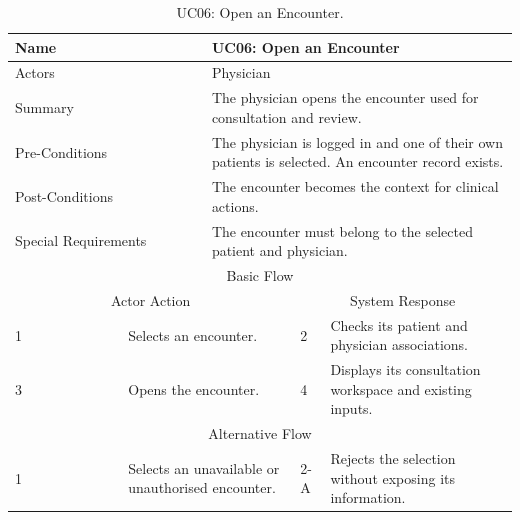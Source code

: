 \begin{table}[htbp]
\centering
\small
\caption{UC06: Open an Encounter.}
\label{tab:kashaf:uc06}
\begin{tabular}{|p{}|p{}|p{}|p{}|p{}|}
\hline
\multicolumn{2}{|p{\dimexpr0.225\textwidth+2\tabcolsep+\arrayrulewidth\relax}|}{Name} & \multicolumn{3}{p{\dimexpr0.575\textwidth+4\tabcolsep+2\arrayrulewidth\relax}|}{UC06: Open an Encounter} \\ \hline
\multicolumn{2}{|p{\dimexpr0.225\textwidth+2\tabcolsep+\arrayrulewidth\relax}|}{Actors} & \multicolumn{3}{p{\dimexpr0.575\textwidth+4\tabcolsep+2\arrayrulewidth\relax}|}{Physician} \\ \hline
\multicolumn{2}{|p{\dimexpr0.225\textwidth+2\tabcolsep+\arrayrulewidth\relax}|}{Summary} & \multicolumn{3}{p{\dimexpr0.575\textwidth+4\tabcolsep+2\arrayrulewidth\relax}|}{The physician opens the encounter used for consultation and review.} \\ \hline
\multicolumn{2}{|p{\dimexpr0.225\textwidth+2\tabcolsep+\arrayrulewidth\relax}|}{Pre-Conditions} & \multicolumn{3}{p{\dimexpr0.575\textwidth+4\tabcolsep+2\arrayrulewidth\relax}|}{The physician is logged in and one of their own patients is selected. An encounter record exists.} \\ \hline
\multicolumn{2}{|p{\dimexpr0.225\textwidth+2\tabcolsep+\arrayrulewidth\relax}|}{Post-Conditions} & \multicolumn{3}{p{\dimexpr0.575\textwidth+4\tabcolsep+2\arrayrulewidth\relax}|}{The encounter becomes the context for clinical actions.} \\ \hline
\multicolumn{2}{|p{\dimexpr0.225\textwidth+2\tabcolsep+\arrayrulewidth\relax}|}{Special Requirements} & \multicolumn{3}{p{\dimexpr0.575\textwidth+4\tabcolsep+2\arrayrulewidth\relax}|}{The encounter must belong to the selected patient and physician.} \\ \hline
\multicolumn{5}{|c|}{Basic Flow} \\ \hline
\multicolumn{3}{|c|}{Actor Action} & \multicolumn{2}{c|}{System Response} \\ \hline
1 & \multicolumn{2}{p{\dimexpr0.37\textwidth+2\tabcolsep+\arrayrulewidth\relax}|}{Selects an encounter.} & 2 & Checks its patient and physician associations. \\ \hline
3 & \multicolumn{2}{p{\dimexpr0.37\textwidth+2\tabcolsep+\arrayrulewidth\relax}|}{Opens the encounter.} & 4 & Displays its consultation workspace and existing inputs. \\ \hline
\multicolumn{5}{|c|}{Alternative Flow} \\ \hline
1 & \multicolumn{2}{p{\dimexpr0.37\textwidth+2\tabcolsep+\arrayrulewidth\relax}|}{Selects an unavailable or unauthorised encounter.} & 2-A & Rejects the selection without exposing its information. \\ \hline
\end{tabular}
\end{table}

